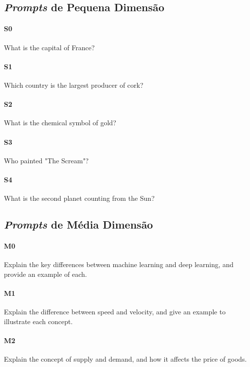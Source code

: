 \subsection{\emph{Prompts} de Pequena Dimensão}

\paragraph{S0} What is the capital of France?

\paragraph{S1} Which country is the largest producer of cork?

\paragraph{S2} What is the chemical symbol of gold?

\paragraph{S3} Who painted "The Scream"?

\paragraph{S4} What is the second planet counting from the Sun?

\subsection{\emph{Prompts} de Média Dimensão}

\paragraph{M0} Explain the key differences between machine learning and deep learning, and provide
               an example of each.

\paragraph{M1} Explain the difference between speed and velocity, and give an example to illustrate
               each concept.

\paragraph{M2} Explain the concept of supply and demand, and how it affects the price of goods.

